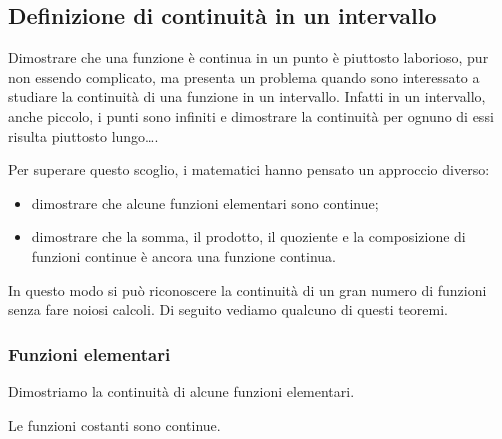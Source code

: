 \begin{comment}
\begin{teorema}[Derivabilità e continuità]
Se una funzione è derivabile in un punto allora è continua in quel punto.
\end{teorema}

\noindent Ipotesi: 
\(f(x) \text{ è derivabile in } c\)
\tab Tesi: 
\(f(x) \text{ è continua in } c\).

\begin{proof}
TODO
\end{proof}
\end{comment}

\subsection{Definizione di continuità in un intervallo}
\label{subsec:cont_definizione}

Dimostrare che una funzione è continua in un punto è piuttosto laborioso, pur 
non essendo complicato, ma presenta un problema quando sono interessato a 
studiare la continuità di una funzione in un intervallo. Infatti in un 
intervallo, anche piccolo, i punti sono infiniti e dimostrare la continuità per 
ognuno di essi risulta piuttosto lungo\dots.

Per superare questo scoglio, i matematici hanno pensato un approccio diverso:

\begin{itemize}
 \item dimostrare che alcune funzioni elementari sono continue;
 \item dimostrare che la somma, il prodotto, il quoziente e la composizione di 
funzioni continue è ancora una funzione continua.
\end{itemize}

In questo modo si può riconoscere la continuità di un gran numero di funzioni 
senza fare noiosi calcoli. Di seguito vediamo qualcuno di questi teoremi.

\subsubsection{Funzioni elementari}
\label{subsubsec:cont_funzionielementari}

Dimostriamo la continuità di alcune funzioni elementari.

\begin{teorema}
Le funzioni costanti sono continue.
\end{teorema}

